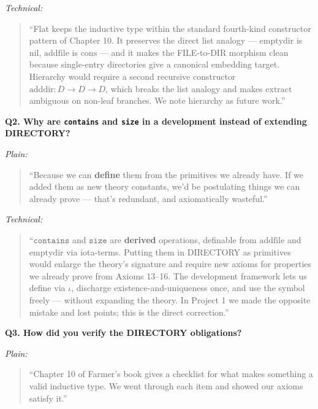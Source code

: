 \documentclass[12pt]{article}
\newenvironment{say}{%
  \par\medskip%
  \begin{quote}%
  \setlength{\parskip}{0.7em}%
  \large\itshape%
}{%
  \end{quote}%
  \medskip%
}
\begin{document}
\textit{\color{pauseclr}Technical:}
\begin{say}
``Flat keeps the inductive type within the standard fourth-kind constructor pattern of Chapter 10. It preserves the direct list analogy --- $\mathrm{emptydir}$ is $\mathrm{nil}$, $\mathrm{addfile}$ is $\mathrm{cons}$ --- and it makes the FILE-to-DIR morphism clean because single-entry directories give a canonical embedding target. Hierarchy would require a second recursive constructor $\mathrm{adddir} : D \to D \to D$, which breaks the list analogy and makes $\mathrm{extract}$ ambiguous on non-leaf branches. We note hierarchy as future work.''
\end{say}

\vspace{0.8em}
\textbf{\color{slidebar}Q2. Why are \texttt{contains} and \texttt{size} in a development instead of extending DIRECTORY?}

\textit{\color{pauseclr}Plain:}
\begin{say}
``Because we can \textbf{define} them from the primitives we already have. If we added them as new theory constants, we'd be postulating things we can already prove --- that's redundant, and axiomatically wasteful.''
\end{say}

\textit{\color{pauseclr}Technical:}
\begin{say}
``$\mathtt{contains}$ and $\mathtt{size}$ are \textbf{derived} operations, definable from $\mathrm{addfile}$ and $\mathrm{emptydir}$ via iota-terms. Putting them in DIRECTORY as primitives would enlarge the theory's signature and require new axioms for properties we already prove from Axioms 13--16. The development framework lets us define via $\iota$, discharge existence-and-uniqueness once, and use the symbol freely --- without expanding the theory. In Project 1 we made the opposite mistake and lost points; this is the direct correction.''
\end{say}

\vspace{0.8em}
\textbf{\color{slidebar}Q3. How did you verify the DIRECTORY obligations?}

\textit{\color{pauseclr}Plain:}
\begin{say}
``Chapter 10 of Farmer's book gives a checklist for what makes something a valid inductive type. We went through each item and showed our axioms satisfy it.''
\end{say}
\end{document}
